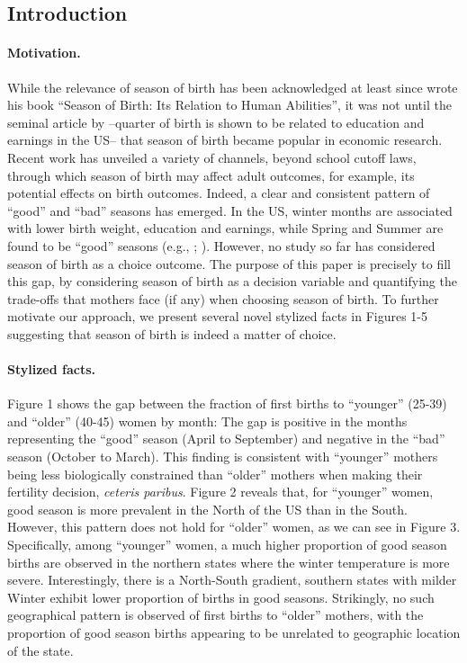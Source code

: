 \documentclass[a4paper, 12 pt]{article}
\theoremstyle{plain}
\begin{document}
\newpage
\begin{doublespace}

\section{Introduction}
\paragraph{Motivation.} While the relevance of season of birth has been acknowledged at least since \citet{Huntington38} wrote his book ``Season of Birth: Its Relation to Human Abilities'', it was not until the seminal article by \citet{AK1991} --quarter of birth is shown to be related to education and earnings in the US-- that season of birth became popular in economic research. Recent work has unveiled a variety of channels, beyond school cutoff laws, through which season of birth may affect adult outcomes, for example, its potential effects on birth outcomes. Indeed, a clear and consistent pattern of ``good'' and ``bad'' seasons has emerged. In the US, winter months are associated with lower birth weight, education and earnings, while Spring and Summer are found to be ``good'' seasons (e.g., \citealp{BucklesHungerman2013}; \citealp{CS2013}). However, no study so far has considered season of birth as a choice outcome. The purpose of this paper is precisely to fill this gap, by considering season of birth as a decision variable and quantifying the trade-offs that mothers face (if any) when choosing season of birth. To further motivate our approach, we present several novel stylized facts in Figures 1-5 suggesting that season of birth is indeed a matter of choice.

\paragraph{Stylized facts.}  Figure 1 shows the gap between the fraction of first births to ``younger'' (25-39) and ``older'' (40-45) women by month: The gap is positive in the months representing the ``good'' season (April to September) and negative in the ``bad'' season (October to March). This finding is consistent with ``younger'' mothers being less biologically constrained than ``older'' mothers when making their fertility decision, \emph{ceteris paribus}. Figure 2 reveals that, for ``younger'' women, good season is more prevalent in the North of the US than in the South. However, this pattern does not hold for ``older'' women, as we can see in Figure 3. Specifically, among ``younger'' women, a much higher proportion of good season births are observed in the northern states where the winter temperature is more severe. Interestingly, there is a North-South gradient, southern states with milder Winter exhibit lower proportion of births in good seasons. Strikingly, no such geographical pattern is observed of first births to ``older'' mothers, with the proportion of good season births appearing to be unrelated to geographic location of the state.


\end{doublespace}
\end{document}

